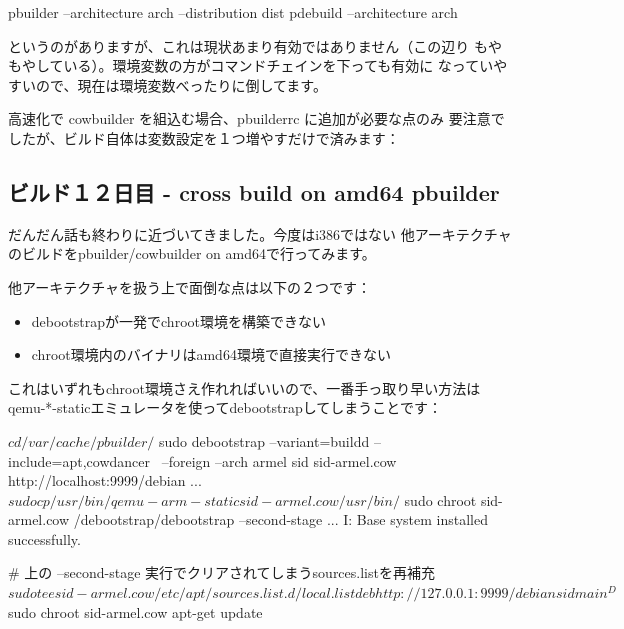 \documentclass[mingoth,a4paper]{jsarticle}
\begin{document}
\begin{commandline}
pbuilder --architecture arch --distribution dist
pdebuild --architecture arch
\end{commandline}

というのがありますが、これは現状あまり有効ではありません（この辺り
もやもやしている）。環境変数の方がコマンドチェインを下っても有効に
なっていやすいので、現在は環境変数べったりに倒してます。

高速化で cowbuilder を組込む場合、pbuilderrc に追加が必要な点のみ
要注意でしたが、ビルド自体は変数設定を１つ増やすだけで済みます：


\subsection{ビルド１２日目 - cross build on amd64 pbuilder}

だんだん話も終わりに近づいてきました。今度はi386ではない
他アーキテクチャのビルドをpbuilder/cowbuilder on amd64で行ってみます。

他アーキテクチャを扱う上で面倒な点は以下の２つです：

\begin{itemize}
\item debootstrapが一発でchroot環境を構築できない
\item chroot環境内のバイナリはamd64環境で直接実行できない
\end{itemize}

これはいずれもchroot環境さえ作れればいいので、一番手っ取り早い方法は
qemu-*-staticエミュレータを使ってdebootstrapしてしまうことです：

\begin{commandline}
$ cd /var/cache/pbuilder/
$ sudo debootstrap --variant=buildd --include=apt,cowdancer \
--foreign --arch armel sid sid-armel.cow http://localhost:9999/debian
...
$ sudo cp /usr/bin/qemu-arm-static sid-armel.cow/usr/bin/
$ sudo chroot sid-armel.cow /debootstrap/debootstrap --second-stage
...
I: Base system installed successfully.

# 上の --second-stage 実行でクリアされてしまうsources.listを再補充
$ sudo tee sid-armel.cow/etc/apt/sources.list.d/local.list
deb http://127.0.0.1:9999/debian sid main
^D
$ sudo chroot sid-armel.cow apt-get update
\end{commandline}
\end{document}
